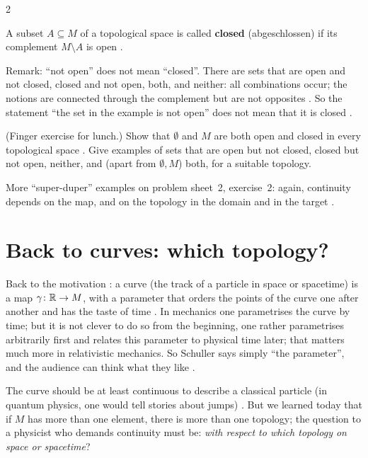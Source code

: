 \begin{paracol}{2}
\begin{definition}\label{def:tm-closed}
A subset $A\subseteq M$ of a topological space is called \textbf{closed} (abgeschlossen) if its complement
$M\setminus A$ is open .
\end{definition}
Remark: ``not open'' does not mean ``closed''. There are sets that are open and not closed, closed and not open, both,
and neither: all combinations occur; the notions are connected through the complement but are not opposites
. So the statement ``the set in the example is not open'' does not mean that it is
closed .
\begin{exercise}\label{ex:tm-clopen}
(Finger exercise for lunch.) Show that $\emptyset$ and $M$ are both open and closed in every topological space
. Give examples of sets that are open but not closed, closed but not open, neither,
and (apart from $\emptyset,M$) both, for a suitable topology.
\end{exercise}
More ``super-duper'' examples on problem sheet~2, exercise~2: again, continuity depends on the map, and on the topology in
the domain and in the target .

\section{Back to curves: which topology?}\label{sec:tm-curves}

Back to the motivation : a curve (the track of a particle in space or spacetime) is a map
$\gamma\colon\mathbb{R}\to M$, with a parameter that orders the points of the curve one after another and has the taste of time
. In mechanics one parametrises the curve by time; but it is not clever to do so from the
beginning, one rather parametrises arbitrarily first and relates this parameter to physical time later; that matters
much more in relativistic mechanics. So Schuller says simply ``the parameter'', and the audience can think what they
like .

The curve should be at least continuous to describe a classical particle (in quantum physics, one would tell stories about
jumps) . But we learned today that if $M$ has more than one element, there is more than
one topology; the question to a physicist who demands continuity must be: \emph{with respect to which topology on space or
spacetime}? 


\end{paracol}
